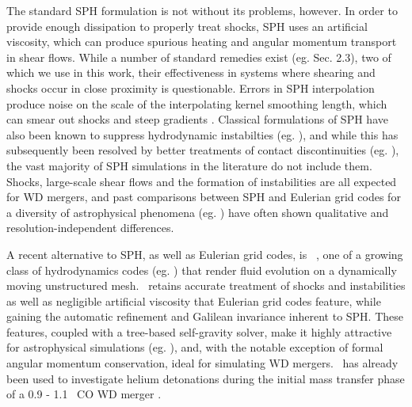 The standard SPH formulation is not without its problems, however.  In order to provide enough dissipation to properly treat shocks, SPH uses an artificial viscosity, which can produce spurious heating and angular momentum transport in shear flows.  While a number of standard remedies exist (eg. \citealt{spri10rev} Sec. 2.3), two of which we use in this work, their effectiveness in systems where shearing and shocks occur in close proximity is questionable.  Errors in SPH interpolation produce noise on the scale of the interpolating kernel smoothing length, which can smear out shocks and steep gradients \citep{spri10rev}.  Classical formulations of SPH have also been known to suppress hydrodynamic instabilties (eg. \citealt{ager+07}), and while this has subsequently been resolved by better treatments of contact discontinuities (eg. \citep{hopk13, hu+14, kell+14}), the vast majority of SPH simulations in the literature do not include them.  Shocks, large-scale shear flows and the formation of instabilities are all expected for WD mergers, and past comparisons between SPH and Eulerian grid codes for a diversity of astrophysical phenomena (eg. \citealt{dval+06, tracsp07, mitc+09}) have often shown qualitative and resolution-independent differences.  

A recent alternative to SPH, as well as Eulerian grid codes, is \arepo\ \citep{spri10}, one of a growing class of hydrodynamics codes (eg. \citealt{duffm11, gabujl12, vandr16}) that render fluid evolution on a dynamically moving unstructured mesh.  \arepo\ retains accurate treatment of shocks and instabilities as well as negligible artificial viscosity that Eulerian grid codes feature, while gaining the automatic refinement and Galilean invariance inherent to SPH.  These features, coupled with a tree-based self-gravity solver, make it highly attractive for astrophysical simulations (eg. \citealt{voge+12, pakms13, hayw+14, marips14, ohlm+16}), and, with the notable exception of formal angular momentum conservation, ideal for simulating WD mergers.  \arepo\ has already been used to investigate helium detonations during the initial mass transfer phase of a 0.9 - 1.1 \Msun\ CO WD merger \citep{pakm+13}.

